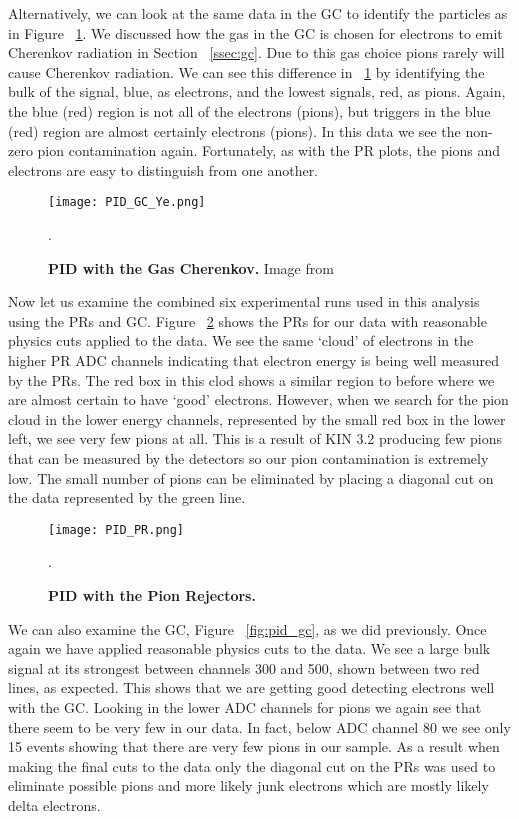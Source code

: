 Alternatively, we can look at the same data in the GC to identify the particles as in Figure ~\ref{fig:pid_gc_ye}. We discussed how the gas in the GC is chosen for electrons to emit Cherenkov radiation in Section ~\ref{ssec:gc}. Due to this gas choice pions rarely will cause Cherenkov radiation. We can see this difference in ~\ref{fig:pid_gc_ye} by identifying the bulk of the signal, blue, as electrons, and the lowest signals, red, as pions. Again, the blue (red) region is not all of the electrons (pions), but triggers in the blue (red) region are almost certainly electrons (pions). In this data we see the non-zero pion contamination again. Fortunately, as with the PR plots, the pions and electrons are easy to distinguish from one another.

\begin{figure}[!ht]
\begin{center}
\texttt{[image: PID\_GC\_Ye.png]}
\end{center}
\caption{
{\bf{PID with the Gas Cherenkov.}} Image from ~\cite{Thesis:Ye}}.
\label{fig:pid_gc_ye}
\end{figure}

Now let us examine the combined six experimental runs used in this analysis using the PRs and GC. Figure ~\ref{fig:pid_pr} shows the PRs for our data with reasonable physics cuts applied to the data. We see the same `cloud' of electrons in the higher PR ADC channels indicating that electron energy is being well measured by the PRs. The red box in this clod shows a similar region to before where we are almost certain to have `good' electrons. However, when we search for the pion cloud in the lower energy channels, represented by the small red box in the lower left, we see very few pions at all. This is a result of KIN 3.2 producing few pions that can be measured by the detectors so our pion contamination is extremely low. The small number of pions can be eliminated by placing a diagonal cut on the data represented by the green line.

\begin{figure}[!ht]
\begin{center}
\texttt{[image: PID\_PR.png]}
\end{center}
\caption{
{\bf{PID with the Pion Rejectors.}} }.
\label{fig:pid_pr}
\end{figure}

We can also examine the GC, Figure ~\ref{fig:pid_gc}, as we did previously. Once again we have applied reasonable physics cuts to the data. We see a large bulk signal at its strongest between channels 300 and 500, shown between two red lines, as expected. This shows that we are getting good detecting electrons well with the GC. Looking in the lower ADC channels for pions we again see that there seem to be very few in our data. In fact, below ADC channel 80 we see only 15 events showing that there are very few pions in our sample. As a result when making the final cuts to the data only the diagonal cut on the PRs was used to eliminate possible pions and more likely junk electrons which are mostly likely delta electrons.

